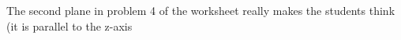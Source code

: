 The second plane in problem 4 of the worksheet really makes the students think (it is parallel to the z-axis
